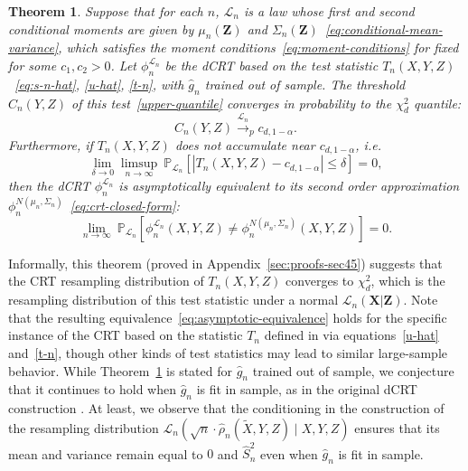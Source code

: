\documentclass[12pt]{article}
\newtheorem{theorem}{Theorem}
\theoremstyle{definition}
\theoremstyle{remark}
\newcommand{\prx}{\bm X}
\newcommand{\srx}{X}
\newcommand{\prz}{\bm Z}
\newcommand{\srz}{Z}
\newcommand{\srxk}{\widetilde X}
\newcommand{\sry}{Y}
\begin{document}
\begin{theorem} \label{thm:equivalence}
Suppose that for each $n$, $\mathcal L_n$ is a law whose first and second conditional moments are given by $\mu_n(\prz)$ and $\Sigma_n(\prz)$~\eqref{eq:conditional-mean-variance}, which satisfies the moment conditions~\eqref{eq:moment-conditions} for fixed for some $c_1, c_2 > 0$. Let $\phi_n^{\mathcal L_n}$ be the dCRT based on the test statistic $T_n(\srx, \sry, \srz)$~\eqref{eq:s-n-hat}, \eqref{u-hat}, \eqref{t-n}, with $\widehat g_n$ trained out of sample. The threshold $C_n(\sry, \srz)$ of this test~\eqref{upper-quantile} converges in probability to the $\chi^2_d$ quantile:
	\begin{equation}
		C_n(Y,Z) \overset{\mathcal L_n}\rightarrow_p c_{d,1-\alpha}.
		\label{eq:threshold-convergence}
	\end{equation}
	Furthermore, if $T_n(\srx, \sry, \srz)$ does not accumulate near $c_{d,1-\alpha}$, i.e.
	\begin{equation}
		\lim_{\delta \rightarrow 0}\limsup_{n \rightarrow \infty}\ \mathbb P_{\mathcal L_n}[|T_n(\srx, \sry, \srz)-c_{d,1-\alpha}| \leq \delta] = 0,
		\label{eq:non-accumulation}
	\end{equation}
	then the dCRT $\phi_n^{\mathcal L_n}$ is asymptotically equivalent to its second order approximation $\phi^{N(\mu_n, \Sigma_n)}_n$~\eqref{eq:crt-closed-form}:
	\begin{equation}
		\lim_{n \rightarrow \infty}\ \mathbb P_{\mathcal L_n}[\phi^{\mathcal L_n}_n(\srx, \sry, \srz) \neq \phi^{N(\mu_n, \Sigma_n)}_n(\srx, \sry, \srz)] = 0.
		\label{eq:asymptotic-equivalence}
	\end{equation}	
\end{theorem}

Informally, this theorem (proved in Appendix~\ref{sec:proofs-sec45}) suggests that the CRT resampling distribution of $T_n(\srx, \sry, \srz)$ converges to $\chi^2_d$, which is the resampling distribution of this test statistic under a normal $\mathcal L_n(\prx|\prz)$. Note that the resulting equivalence~\eqref{eq:asymptotic-equivalence} holds for the specific instance of the CRT based on the statistic $T_n$ defined in via equations~\eqref{u-hat} and~\eqref{t-n}, though other kinds of test statistics may lead to similar large-sample behavior. While Theorem~\ref{thm:equivalence} is stated for $\widehat g_n$ trained out of sample, we conjecture that it continues to hold when $\widehat g_n$ is fit in sample, as in the original dCRT construction \cite{Liu2020}. At least, we observe that the conditioning in the construction of the resampling distribution $\mathcal L_n(\sqrt n \cdot \widehat \rho_n(\srxk, \sry, \srz) \mid \srx, \sry, \srz)$ ensures that its mean and variance remain equal to $0$ and $\widehat S_n^2$ even when $\widehat g_n$ is fit in sample.
\end{document}
